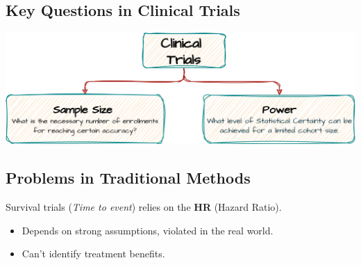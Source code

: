 \documentclass[a0,landscape]{a0poster}
\newcommand{\xmark}{\ding{55}}            %
\begin{document}
\begin{minipage}[t]{0.44\linewidth}

    \subsection*{\color{HeadingColor}\Large Key Questions in Clinical Trials}
    {\centering \includegraphics[width=\linewidth,height = 0.4\linewidth]{images/diag-CT.png}\par}

    \subsection*{\color{HeadingColor}\Large Problems in Traditional Methods}
    \Large Survival trials (\textit{Time to event}) relies on the \textbf{HR} (Hazard Ratio).
   \begin{itemize}[label={\color{BulletColor}\Large \xmark}]
    \item \Large Depends on strong assumptions, violated in the real world.
    \item \Large Can't identify treatment benefits.
\end{itemize}
    

\end{minipage}
\end{document}
